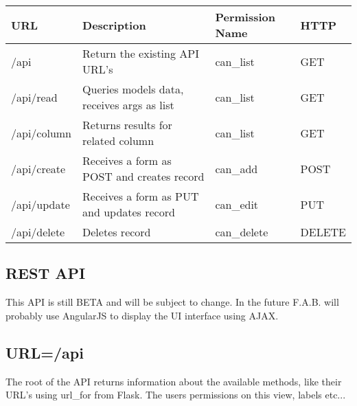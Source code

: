 \documentclass[letterpaper,10pt,english]{sphinxmanual}
\begin{document}
\begin{tabulary}{\linewidth}{|L|L|L|L|}
\hline
\textsf{\relax 
URL
} & \textsf{\relax 
Description
} & \textsf{\relax 
Permission Name
} & \textsf{\relax 
HTTP
}\\
\hline
/api
 & 
Return the existing API URL's
 & 
can\_list
 & 
GET
\\
\hline
/api/read
 & 
Queries models data, receives args as list
 & 
can\_list
 & 
GET
\\
\hline
/api/column
 & 
Returns results for related column
 & 
can\_list
 & 
GET
\\
\hline
/api/create
 & 
Receives a form as POST and creates record
 & 
can\_add
 & 
POST
\\
\hline
/api/update
 & 
Receives a form as PUT and updates record
 & 
can\_edit
 & 
PUT
\\
\hline
/api/delete
 & 
Deletes record
 & 
can\_delete
 & 
DELETE
\\
\hline\end{tabulary}



\subsection{REST API}
\label{quickhowto:rest-api}
This API is still BETA and will be subject to change. In the future F.A.B. will probably use AngularJS
to display the UI interface using AJAX.


\subsection{URL=/api}
\label{quickhowto:url-api}
The root of the API returns information about the available methods, like their URL's using url\_for from Flask.
The users permissions on this view, labels etc...
\end{document}
